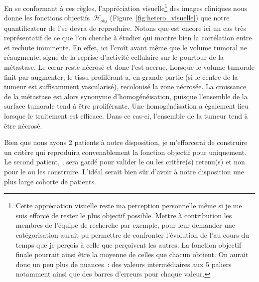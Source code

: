 \documentclass[main.tex]{subfiles}
\begin{document}
En se conformant à ces règles, l'appréciation visuelle\footnote{\samepage Cette appréciation visuelle reste ma perception personnelle même si je me suis efforcé de rester le plus objectif possible. Mettre à contribution les membres de l'équipe de recherche par exemple, pour leur demander une catégorisation aurait pu permettre de confronter l'évolution de l'\hetero au cours du temps que je perçois à celle que perçoivent les autres. La fonction objectif finale pourrait ainsi être la moyenne de celles que chacun obtient. On aurait donc un peu plus de nuances~: des valeurs intermédiaires aux 5 paliers notamment ainsi que des barres d'erreurs pour chaque valeur.}
 des images cliniques nous donne les fonctions objectifs~$\mathscr{H}_{obj}$ (\cf Figure~\ref{fig:hetero_visuelle}) que notre quantificateur de l'\hetero se devra de reproduire. 
Notons que \Nber est encore ici un cas très représentatif de ce que l'on cherche à étudier \ie qui montre bien la corrélation entre \hetero et rechute imminente. En effet, ici l'\hetero croît avant même que le volume tumoral ne réaugmente, signe de la reprise d'activité cellulaire sur le pourtour de la métastase. Le c\oe{}ur reste nécrosé et donc l'\hetero est accrue. Lorsque le volume tumorale finit par augmenter, le tissu proliférant a, en grande partie (si le centre de la tumeur est suffisamment vascularisé), recolonisé la zone nécrosée. La croissance de la métastase est alors synonyme d'homogénéisation, puisque l'ensemble de la surface tumorale tend à être proliférante. Une homogénéisation a également lieu lorsque le traitement est efficace. Dans ce cas-ci, l'ensemble de la tumeur tend à être nécrosé.


Bien que nous ayons 2 patients à notre disposition, je m'efforcerai de construire un critère qui reproduira convenablement la fonction objectif pour \Nber uniquement. Le second patient, \Chen, sera gardé pour valider le ou les critère(s) retenu(s) et non pour le ou les construire. L'idéal serait bien sûr d'avoir à notre disposition une plus large cohorte de patients.
\end{document}
